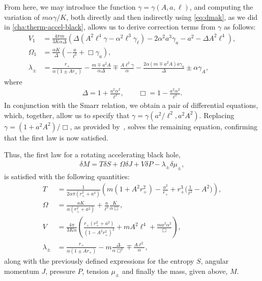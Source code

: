 \documentclass[
twoside,
openright,
frontopenright,
]{dmathesis}
\newcommand{\nn}{\nonumber}
\begin{document}
From here, we may introduce the function $\gamma=\gamma(A,a,\ell)$, and
computing the variation of $m\alpha\gamma/K$, both directly and then indirectly using
\cref{eq:dmak}, as we did in \cref{cha:therm-accel-black}, allows us to derive
correction terms from $\gamma$ as follows:
\begin{align}
  V_1 &= \frac{4\pi
        m}{3K\alpha\Delta}\left(\Delta(A^2\ell^4\gamma-\alpha^2\ell^3\gamma_\ell)
        - 2\alpha^2 a^3 \gamma_a - a^2 - \Delta A^2\ell^4\right),\nn\\
  \Omega_1 &= \frac{\alpha
             K}{\Delta}\left(-\frac{a}{\ell^2}+\Box\gamma_a\right),\nn\\
  \lambda_\pm &= \frac{r_+}{\alpha(1\pm Ar_+)}- \frac{m\mp a^2 A}{\alpha \Delta}
                \mp \frac{A\ell^2\gamma}{\alpha} - \frac{2\alpha(m\mp a^2 A)
                a\gamma_a}{\Delta} \pm \alpha \gamma_A,
\end{align}
where
\begin{align}
  \Delta = 1 + \frac{a^2\alpha^2}{\ell^2}, \qquad \Box = 1
  - \frac{a^2\alpha^2}{\ell^2}.
\end{align}
In conjunction with the Smarr relation, we obtain a pair of differential
equations, which, together, allow us to specify that $\gamma = \gamma(a^2/\ell^2,
a^2A^2)$. Replacing $\gamma = (1+a^2A^2)/\Box$, as provided by~\cite{Anabalon:2018aa},
solves the remaining equation, confirming that the first law is now satisfied.

Thus, the first law for a rotating accelerating black hole,
\begin{align}
  \delta M = T\delta S + \Omega \delta J + V\delta P - \lambda_\pm\delta \mu_\pm,
\end{align}
is satisfied with the following quantities:
\begin{align}
  T &= \frac{1}{2\alpha\pi(r_+^2+a^2)}\left(m(1+A^2r_+^2)
  - \frac{a^2}{r_+}+r_+^3\Big(\frac{1}{\ell^2}-A^2\Big)\right),\nn\\
  \Omega &= \frac{a K}{\alpha(r_+^2+a^2)} + \frac{a}{\ell^2}\frac{K}{\alpha\Box},\nn\\
  V &= \frac{4\pi}{3K\alpha}\left(\frac{r_+ (r_+^2+a^2)}{(1-A^2r_+^2)^2} + mA^2
      \ell^4 + \frac{ma^2\alpha^2}{\Box}\right),\nn\\
  \lambda_\pm &= \frac{r_+}{\alpha(1\pm Ar_+)}- m\frac{\Delta}{\alpha\Box^2} \mp
                \frac{A\ell^2}{\alpha},
\end{align}
along with the previously defined expressions for the entropy $S$, angular momentum
$J$, pressure $P$, tension $\mu_\pm$ and finally the mass, given above, $M$.

%
%


{}


\end{document}
